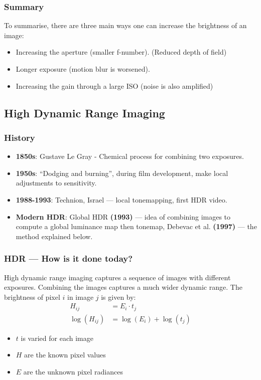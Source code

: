 \documentclass{article}\author{Hawley, Adam}
\begin{document}
\subsubsection{Summary}
To summarise, there are three main ways one can increase the brightness of an image:

\begin{itemize}
	\item Increasing the aperture (smaller f-number). (Reduced depth of field)
	\item Longer exposure (motion blur is worsened).
	\item Increasing the gain through a large ISO (noise is also amplified)
\end{itemize}
\subsection{High Dynamic Range Imaging}
\subsubsection{History}
\begin{itemize}
	\item {\bf 1850s}: Gustave Le Gray - Chemical process for combining two exposures.
	\item {\bf 1950s}: ``Dodging and burning'', during film development, make local adjustments to sensitivity.
	\item {\bf 1988-1993}: Technion, Israel --- local tonemapping, first HDR video.
	\item {\bf Modern HDR}: Global HDR {\bf (1993)} --- idea of combining images to compute a global luminance map then tonemap, Debevac et al. {\bf (1997)} --- the method explained below. 
\end{itemize}

\subsubsection{HDR --- How is it done today?}
High dynamic range imaging captures a sequence of images with different exposures. 
Combining the images captures a much wider dynamic range.
The brightness of pixel $i$ in image $j$ is given by:
\begin{align*}
	H_{ij} &= E_i \cdot t_j \\
	\log(H_{ij}) &= \log(E_i) + \log(t_j)
\end{align*}
\begin{itemize}
	\item $t$ is varied for each image
	\item $H$ are the known pixel values
	\item $E$ are the unknown pixel radiances
\end{itemize}
\end{document}
